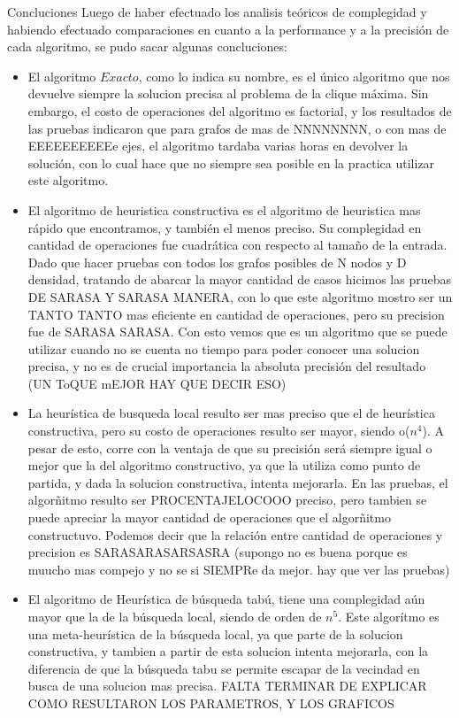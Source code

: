\documentclass[12pt,titlepage]{article}
\newcommand{\tab}{\hspace*{2em}}
\begin{document}
	\begin{section}{Concluciones}
	\tab Luego de haber efectuado los analisis teóricos de complegidad y habiendo efectuado comparaciones en cuanto a la performance y a la precisión de cada algoritmo, se pudo sacar algunas concluciones:
	\begin{itemize}
		\item El algoritmo $Exacto$, como lo indica su nombre, es el único algoritmo que nos devuelve siempre la solucion precisa al problema de la clique máxima. Sin embargo, el costo de operaciones del algoritmo es factorial, y los resultados de las pruebas indicaron que para grafos de mas de NNNNNNNN, o con mas de EEEEEEEEEEe ejes, el algoritmo tardaba varias horas en devolver la solución, con lo cual hace que no siempre sea posible en la practica utilizar este algoritmo.
		\item El algoritmo de heuristica constructiva es el algoritmo de heuristica mas rápido que encontramos, y también el menos preciso. Su complegidad en cantidad de operaciones fue cuadrática con respecto al tamaño de la entrada. Dado que hacer pruebas con todos los grafos posibles de N nodos y D densidad, tratando de abarcar la mayor cantidad de casos hicimos las pruebas  DE SARASA Y SARASA MANERA, con lo que este algoritmo mostro ser un TANTO TANTO mas eficiente en cantidad de operaciones, pero su precision fue de SARASA SARASA. Con esto vemos que es un algoritmo que se puede utilizar cuando no se cuenta no tiempo para poder conocer una solucion precisa, y no es de crucial importancia la absoluta precisión del resultado (UN ToQUE mEJOR HAY QUE DECIR ESO)
		\item La heurística de busqueda local resulto ser mas preciso que el de heurística constructiva, pero su costo de operaciones resulto ser mayor, siendo o($n^4$). A pesar de esto, corre con la ventaja de que su precisión será siempre igual o mejor que la del algoritmo constructivo, ya que la utiliza como punto de partida, y dada la solucion constructiva, intenta mejorarla. En las pruebas, el algorñitmo resulto ser PROCENTAJELOCOOO preciso, pero tambien se puede apreciar la mayor cantidad de operaciones que el algorñitmo constructuvo. Podemos decir que la relación entre cantidad de operaciones y precision es SARASARASARSASRA (supongo no es buena porque es muucho mas compejo y no se si SIEMPRe da mejor. hay que ver las pruebas)
		\item El algoritmo de Heurística de búsqueda tabú, tiene una complegidad aún mayor que la de la búsqueda local, siendo de orden de $n^5$. Este algorítmo es una meta-heurística de la búsqueda local, ya que parte de la solucion constructiva, y tambien a partir de esta solucion intenta mejorarla, con la diferencia de que la búsqueda tabu se permite escapar de la vecindad en busca de una solucion mas precisa. FALTA TERMINAR DE EXPLICAR COMO RESULTARON LOS PARAMETROS, Y LOS GRAFICOS  
	\end{itemize}	
	\end{section}
	
\end{document}

